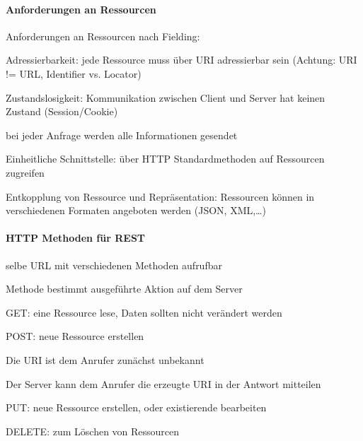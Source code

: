 \documentclass[10pt]{article}
\begin{document}
  \paragraph{Anforderungen an Ressourcen}
  
  Anforderungen an Ressourcen nach Fielding: 
  \begin{enumerate*}
    \item Adressierbarkeit: jede Ressource muss über URI adressierbar sein (Achtung: URI != URL, Identifier vs. Locator)
    \item Zustandslosigkeit: Kommunikation zwischen Client und Server hat keinen Zustand (Session/Cookie)
    \begin{itemize*}
      \item bei jeder Anfrage werden alle Informationen gesendet
    \end{itemize*}
    \item Einheitliche Schnittstelle: über HTTP Standardmethoden auf Ressourcen zugreifen
    \item Entkopplung von Ressource und Repräsentation: Ressourcen können in verschiedenen Formaten angeboten werden (JSON, XML,…)
  \end{enumerate*}
  
  \paragraph{HTTP Methoden für REST}
  
  \begin{itemize*}
    \item selbe URL mit verschiedenen Methoden aufrufbar
    \item Methode bestimmt ausgeführte Aktion auf dem Server
  \end{itemize*}
  \begin{itemize*}
    \item[GET:] eine Ressource lese, Daten sollten nicht verändert werden
    \item[POST:] neue Ressource erstellen
    \begin{itemize*}
      \item Die URI ist dem Anrufer zunächst unbekannt
      \item Der Server kann dem Anrufer die erzeugte URI in der Antwort mitteilen
    \end{itemize*}
    \item[PUT:] neue Ressource erstellen, oder existierende bearbeiten
    \item[DELETE:] zum Löschen von Ressourcen
  \end{itemize*}
  
\end{document}
